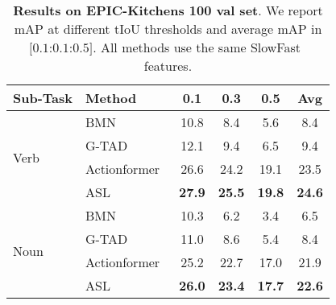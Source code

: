 \documentclass[10pt,twocolumn,letterpaper]{article}
\begin{document}
\begin{table}[t]
    \centering
    \caption{\label{tab:result_epickitchens} \textbf{Results on EPIC-Kitchens 100 val set}. We report mAP at different tIoU thresholds and average mAP in $[0.1$:$0.1$:$0.5]$. All methods use the same SlowFast~\cite{slowfast,Damen2022RESCALING} features. }
    \vspace{0.5em}
    \small{
	\setlength{\tabcolsep}{2.5pt}
	\begin{tabular}{l|l|cccc}
        \toprule
	{Sub-Task} & {Method} & 0.1 &0.3 &  0.5 & Avg\\
		\hline
	\multirow{4}{*}{Verb} & BMN~\cite{lin2019bmn} & 10.8	&8.4 &5.6&8.4 \\
	& G-TAD~\cite{xu2020gtad} & 12.1 &  9.4 &  6.5 & 9.4\\
	& Actionformer~\cite{zhang2022actionformer} & 26.6 & 24.2  & 19.1 & 23.5 \\
        & ASL & \textbf{27.9} & \textbf{25.5} & \textbf{19.8} & \textbf{24.6} \\
	\hline
	\multirow{4}{*}{Noun} & BMN~\cite{lin2019bmn} & 10.3	&6.2&3.4&6.5 \\
	& G-TAD~\cite{xu2020gtad} & 11.0  & 8.6  & 5.4 & 8.4\\
	& Actionformer~\cite{zhang2022actionformer} & 25.2  & 22.7  & 17.0 & 21.9 \\
        & ASL & \textbf{26.0} & \textbf{23.4} & \textbf{17.7} & \textbf{22.6} \\
        \bottomrule
	\end{tabular}}
\end{table}
\end{document}
